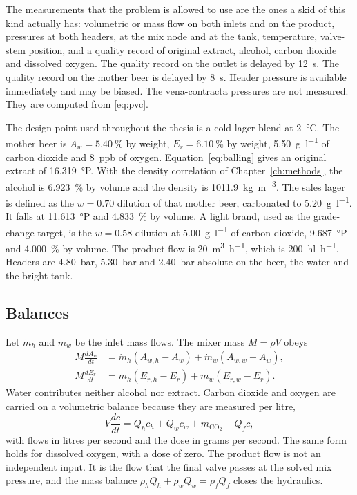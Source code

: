 The measurements that the problem is allowed to use are the ones a skid of this kind actually has: volumetric or mass flow on both inlets and on the product, pressures at both headers, at the mix node and at the tank, temperature, valve-stem position, and a quality record of original extract, alcohol, carbon dioxide and dissolved oxygen. The quality record on the outlet is delayed by \SI{12}{\second}. The quality record on the mother beer is delayed by \SI{8}{\second}. Header pressure is available immediately and may be biased. The vena-contracta pressures are not measured. They are computed from \eqref{eq:pvc}.

The design point used throughout the thesis is a cold lager blend at \SI{2}{\celsius}. The mother beer is $A_w=\SI{5.40}{\percent}$ by weight, $E_r=\SI{6.10}{\percent}$ by weight, \SI{5.50}{\gram\per\litre} of carbon dioxide and \SI{8}{ppb} of oxygen. Equation~\eqref{eq:balling} gives an original extract of \SI{16.319}{\degree}P. With the density correlation of Chapter~\ref{ch:methods}, the alcohol is \SI{6.923}{\percent} by volume and the density is \SI{1011.9}{\kilogram\per\cubic\metre}. The sales lager is defined as the $w=0.70$ dilution of that mother beer, carbonated to \SI{5.20}{\gram\per\litre}. It falls at \SI{11.613}{\degree}P and \SI{4.833}{\percent} by volume. A light brand, used as the grade-change target, is the $w=0.58$ dilution at \SI{5.00}{\gram\per\litre} of carbon dioxide, \SI{9.687}{\degree}P and \SI{4.000}{\percent} by volume. The product flow is \SI{20}{\cubic\metre\per\hour}, which is \SI{200}{\hecto\litre\per\hour}. Headers are \SI{4.80}{bar}, \SI{5.30}{bar} and \SI{2.40}{bar} absolute on the beer, the water and the bright tank.

\subsection{Balances}

Let $\dot m_h$ and $\dot m_w$ be the inlet mass flows. The mixer mass $M=\rho V$ obeys
\begin{align}
\label{eq:ode}
M\frac{dA_w}{dt}
&=
\dot m_h(A_{w,h}-A_w) + \dot m_w(A_{w,w}-A_w),
\\
M\frac{dE_r}{dt}
&=
\dot m_h(E_{r,h}-E_r) + \dot m_w(E_{r,w}-E_r).
\end{align}
Water contributes neither alcohol nor extract. Carbon dioxide and oxygen are carried on a volumetric balance because they are measured per litre,
\begin{equation}
\label{eq:co2bal}
V\frac{dc}{dt}
=
Q_h c_h + Q_w c_w + \dot m_{\mathrm{CO_2}} - Q_f c,
\end{equation}
with flows in litres per second and the dose in grams per second. The same form holds for dissolved oxygen, with a dose of zero. The product flow is not an independent input. It is the flow that the final valve passes at the solved mix pressure, and the mass balance $\rho_h Q_h + \rho_w Q_w = \rho_f Q_f$ closes the hydraulics.

